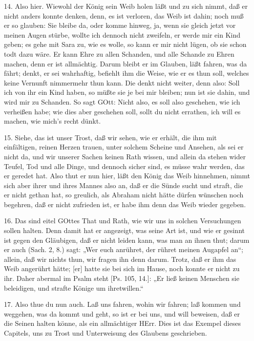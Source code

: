 14. Also hier. Wiewohl der König sein Weib holen läßt und zu sich nimmt, daß er nicht anders konnte denken, denn, es ist verloren, das Weib ist dahin; noch muß er so glauben: Sie bleibe da, oder komme hinweg, ja, wenn sie gleich jetzt vor meinen Augen stürbe, wollte ich dennoch nicht zweifeln, er werde mir ein Kind geben; es gehe mit Sara zu, wie es wolle, so kann er mir nicht lügen, ob sie schon todt dazu wäre. Er kann Ehre zu allen Schanden, und alle Schande zu Ehren machen, denn er ist allmächtig. Darum bleibt er im Glauben, läßt fahren, was da fährt; denkt, er sei wahrhaftig, befiehlt ihm die Weise, wie er es thun soll, welches keine Vernunft nimmermehr thun kann. Die denkt nicht weiter, denn also: Soll ich von ihr ein Kind haben, so müßte sie je bei mir bleiben; nun ist sie dahin, und wird mir zu Schanden. So sagt GOtt: Nicht also, es soll also geschehen, wie ich verheißen habe; wie dies aber geschehen soll, sollt du nicht errathen, ich will es machen, wie mich’s recht dünkt.

15. Siehe, das ist unser Trost, daß wir sehen, wie er erhält, die ihm mit einfältigen, reinen Herzen trauen, unter solchem Scheine und Ansehen, als sei er nicht da, und wir unserer Sachen keinen Rath wissen, und allein da stehen wider Teufel, Tod und alle Dinge, und dennoch sicher sind, es müsse wahr werden, das er geredet hat. Also thut er nun hier, läßt den König das Weib hinnehmen, nimmt sich aber ihrer und ihres Mannes also an, daß er die Sünde sucht und straft, die er nicht gethan hat, so greulich, als Abraham nicht hätte dürfen wünschen noch begehren, daß er nicht zufrieden ist, er habe ihm denn das Weib wieder gegeben.

16. Das sind eitel GOttes That und Rath, wie wir uns in solchen Versuchungen sollen halten. Denn damit hat er angezeigt, was seine Art ist, und wie er gesinnt ist gegen den Gläubigen, daß er nicht leiden kann, was man an ihnen thut; darum er auch (Sach. 2, 8.) sagt: „Wer euch anrühret, der rühret meinen Augapfel an“; allein, daß wir nichts thun, wir fragen ihn denn darum. Trotz, daß er ihm das Weib angerührt hätte; [er] hatte sie bei sich im Hause, noch konnte er nicht zu ihr. Daher abermal im Psalm steht [Ps. 105, 14.]: „Er ließ keinen Menschen sie beleidigen, und strafte Könige um ihretwillen.“

17. Also thue du nun auch. Laß uns fahren, wohin wir fahren; laß kommen und weggehen, was da kommt und geht, so ist er bei uns, und will beweisen, daß er die Seinen halten könne, als ein allmächtiger HErr. Dies ist das Exempel dieses Capitels, uns zu Trost und Unterweisung des Glaubens geschrieben.

